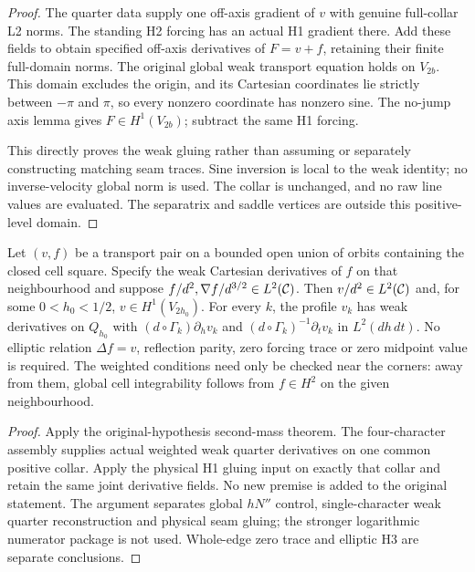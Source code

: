 \begin{proof}
\leanok
The quarter data supply one off-axis gradient of $v$ with genuine full-collar
L2 norms. The standing H2 forcing has an actual H1 gradient there.
Add these fields to obtain specified off-axis derivatives of $F=v+f$,
retaining their finite full-domain norms.
The original global weak transport equation holds on $V_{2b}$.
This domain excludes the origin, and its Cartesian coordinates lie strictly
between $-\pi$ and $\pi$, so every nonzero coordinate has nonzero sine.
The no-jump axis lemma gives $F\in H^1(V_{2b})$; subtract the same H1 forcing.

This directly proves the weak gluing rather than assuming or separately
constructing matching seam traces. Sine inversion is local to the weak identity;
no inverse-velocity global norm is used.
The collar is unchanged, and no raw line values are evaluated.
The separatrix and saddle vertices are outside this positive-level domain.
\end{proof}

\begin{lemma}
\label{lem:weighted-transport-h1}
\leanok
Let $(v,f)$ be a transport pair on a bounded open union of orbits containing
the closed cell square. Specify the weak Cartesian derivatives of $f$ on
that neighbourhood and suppose $f/d^2,\nabla f/d^{3/2}\in L^2(\mathcal{C})$.
Then $v/d^2\in L^2(\mathcal{C})$ and, for some $0<h_0<1/2$,
$v\in H^1(V_{2h_0})$.
For every $k$, the profile $v_k$ has weak derivatives on $Q_{h_0}$ with
$(d\circ\Gamma_k)\partial_hv_k$ and
$(d\circ\Gamma_k)^{-1}\partial_tv_k$ in $L^2(dh\,dt)$.
No elliptic relation $\Delta f=v$, reflection parity, zero forcing
trace or zero midpoint value is required. The weighted conditions need only
be checked near the corners: away from them, global cell integrability
follows from $f\in H^2$ on the given neighbourhood.
\end{lemma}

\begin{proof}
\leanok
Apply the original-hypothesis second-mass theorem.
The four-character assembly supplies actual weighted weak quarter derivatives
on one common positive collar. Apply the physical H1 gluing input on exactly
that collar and retain the same joint derivative fields.
No new premise is added to the original statement. The argument separates
global $hN''$ control, single-character weak quarter reconstruction and physical
seam gluing; the stronger logarithmic numerator package is not used.
Whole-edge zero trace and elliptic H3 are separate conclusions.
\end{proof}

